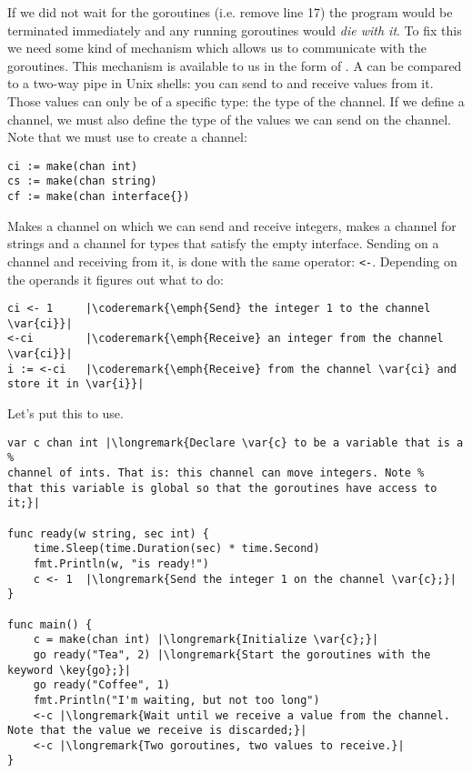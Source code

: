 If we did not wait for the goroutines (i.e. remove line 17) the program
would be terminated immediately and any running goroutines would
\emph{die with it}. 
To fix this we need some kind of mechanism which allows us to
communicate with the goroutines. This mechanism is available
to us in the form of . A
 can be
compared to a two-way pipe in Unix shells: you can send to and receive
values from it. Those values can only be of a specific type: the
type of the channel. If we define a channel, we must also define the
type of the values we can send on the channel. Note that we must use
 to create a channel:
\begin{lstlisting}
ci := make(chan int)
cs := make(chan string)
cf := make(chan interface{})
\end{lstlisting}
Makes  a channel on which we can send and receive integers,
makes  a channel for strings and  a channel for types
that satisfy the empty interface. 
Sending on a channel and receiving from it, is done with the same operator:
\lstinline{<-}. 
Depending on the operands it figures out what to do:
\begin{lstlisting}
ci <- 1	    |\coderemark{\emph{Send} the integer 1 to the channel \var{ci}}|
<-ci	    |\coderemark{\emph{Receive} an integer from the channel \var{ci}}|
i := <-ci   |\coderemark{\emph{Receive} from the channel \var{ci} and store it in \var{i}}|
\end{lstlisting}
Let's put this to use.
\begin{lstlisting}[numbers=none,caption=Go routines and a channel,label=src:sleeping with channels]
var c chan int |\longremark{Declare \var{c} to be a variable that is a %
channel of ints. That is: this channel can move integers. Note %
that this variable is global so that the goroutines have access to it;}|

func ready(w string, sec int) {
	time.Sleep(time.Duration(sec) * time.Second)
	fmt.Println(w, "is ready!")
	c <- 1	|\longremark{Send the integer 1 on the channel \var{c};}|
}

func main() {
	c = make(chan int) |\longremark{Initialize \var{c};}|
	go ready("Tea", 2) |\longremark{Start the goroutines with the keyword \key{go};}|
	go ready("Coffee", 1)
	fmt.Println("I'm waiting, but not too long")
	<-c |\longremark{Wait until we receive a value from the channel. Note that the value we receive is discarded;}|
	<-c |\longremark{Two goroutines, two values to receive.}|
}
\end{lstlisting}


